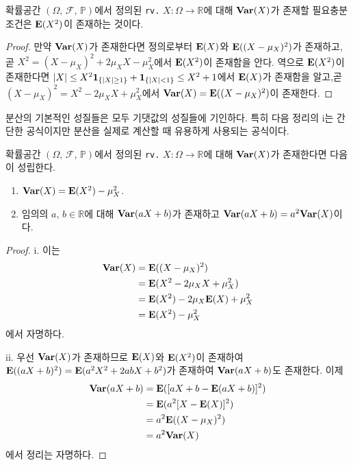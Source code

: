 \begin{proposition}
    확률공간 $(\Omega,\,\mathcal{F},\,\mathbb{P})$에서 정의된 \texttt{rv.} $X:\Omega\to\mathbb{R}$에 대해 $\mathbf{Var}(X)$가 존재할 필요충분조건은 $\mathbf{E}(X^2)$이 존재하는 것이다.
\end{proposition}

\begin{proof}
    만약 $\mathbf{Var}(X)$가 존재한다면 정의로부터 $\mathbf{E}(X)$와 $\mathbf{E}((X-\mu_X)^2)$가 존재하고, 곧 $X^2=(X-\mu_X)^2+2\mu_XX-\mu_X^2$에서 $\mathbf{E}(X^2)$이 존재함을 안다. 역으로 $\mathbf{E}(X^2)$이 존재한다면 $|X|\leq X^2\mathbf{1}_{\{|X|\geq1\}}+\mathbf{1}_{\{|X|<1\}}\leq X^2+1$에서 $\mathbf{E}(X)$가 존재함을 알고,곧 $(X-\mu_X)^2=X^2-2\mu_XX+\mu_X^2$에서 $\mathbf{Var}(X)=\mathbf{E}((X-\mu_X)^2)$이 존재한다.
\end{proof}

분산의 기본적인 성질들은 모두 기댓값의 성질들에 기인하다. 특히 다음 정리의 i는 간단한 공식이지만 분산을 실제로 계산할 때 유용하게 사용되는 공식이다.

\begin{theorem}
    확률공간 $(\Omega,\,\mathcal{F},\,\mathbb{P})$에서 정의된 \texttt{rv.} $X:\Omega\to\mathbb{R}$에 대해 $\mathbf{Var}(X)$가 존재한다면 다음이 성립한다.
    \begin{enumerate}
        \item $\mathbf{Var}(X)=\mathbf{E}(X^2)-\mu_X^2$.
        \item 임의의 $a,\,b\in\mathbb{R}$에 대해 $\mathbf{Var}(aX+b)$가 존재하고 $\mathbf{Var}(aX+b)=a^2\mathbf{Var}(X)$이다.
    \end{enumerate}
\end{theorem}

\begin{proof}
    i. 이는
    \begin{align*}
        \mathbf{Var}(X)&=\mathbf{E}((X-\mu_X)^2)\\
        &=\mathbf{E}(X^2-2\mu_XX+\mu_X^2)\\
        &=\mathbf{E}(X^2)-2\mu_X\mathbf{E}(X)+\mu_X^2\\
        &=\mathbf{E}(X^2)-\mu_X^2
    \end{align*}
    에서 자명하다.

    ii. 우선 $\mathbf{Var}(X)$가 존재하므로 $\mathbf{E}(X)$와 $\mathbf{E}(X^2)$이 존재하여 $\mathbf{E}((aX+b)^2)=\mathbf{E}(a^2X^2+2abX+b^2)$가 존재하여 $\mathbf{Var}(aX+b)$도 존재한다. 이제
    \begin{align*}
        \mathbf{Var}(aX+b)&=\mathbf{E}([aX+b-\mathbf{E}(aX+b)]^2)\\
        &=\mathbf{E}(a^2[X-\mathbf{E}(X)]^2)\\
        &=a^2\mathbf{E}((X-\mu_X)^2)\\
        &=a^2\mathbf{Var}(X)
    \end{align*}
   에서 정리는 자명하다.
\end{proof}


